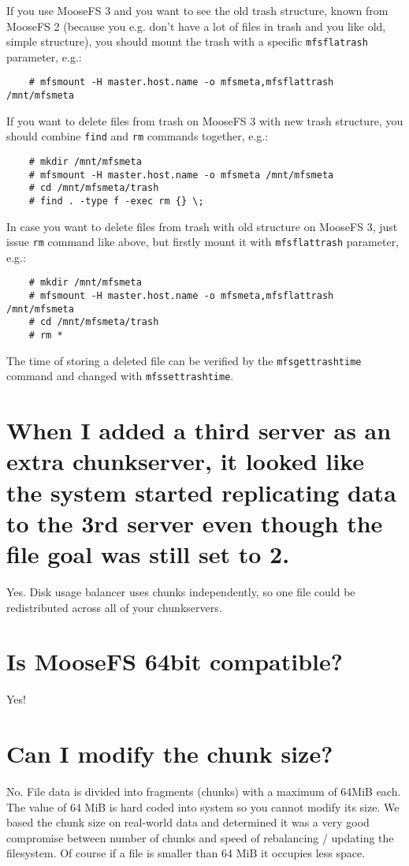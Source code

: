 \documentclass[a4paper,11pt,english]{report}
\def\code#1{\texttt{#1}}
\begin{document}
		If you use MooseFS 3 and you want to see the old trash structure, known from MooseFS 2 (because you e.g. don't have a lot of files in trash and you like old, simple structure), you should mount the trash with a specific \code{mfsflatrash} parameter, e.g.:
		\begin{lstlisting}
	# mfsmount -H master.host.name -o mfsmeta,mfsflattrash /mnt/mfsmeta
		\end{lstlisting}
				
		If you want to delete files from trash on MooseFS 3 with new trash structure, you should combine \code{find} and \code{rm} commands together, e.g.:
		
		\begin{lstlisting}
	# mkdir /mnt/mfsmeta
	# mfsmount -H master.host.name -o mfsmeta /mnt/mfsmeta
	# cd /mnt/mfsmeta/trash
	# find . -type f -exec rm {} \;
		\end{lstlisting}
		
		In case you want to delete files from trash with old structure on MooseFS 3, just issue \code{rm} command like above, but firstly mount it with \code{mfsflattrash} parameter, e.g.:
		
		\begin{lstlisting}
	# mkdir /mnt/mfsmeta
	# mfsmount -H master.host.name -o mfsmeta,mfsflattrash /mnt/mfsmeta
	# cd /mnt/mfsmeta/trash
	# rm *
		\end{lstlisting}
		
		The time of storing a deleted file can be verified by the \code{mfsgettrashtime} command and changed with \code{mfssettrashtime}.
		
		
		\section{When I added a third server as an extra chunkserver, it looked like the system started replicating data to the 3rd server even though the file goal was still set to 2.}
		Yes. Disk usage balancer uses chunks independently, so one file could be redistributed across all of your chunkservers.
		
		
		\section{Is MooseFS 64bit compatible?}
		Yes!
		
		
		\section{Can I modify the chunk size?}
		No. File data is divided into fragments (chunks) with a maximum of 64MiB each. The value of 64 MiB is hard coded into system so you cannot modify its size. We based the chunk size on real-world data and determined it was a very good compromise between number of chunks and speed of rebalancing / updating the filesystem. Of course if a file is smaller than 64 MiB it occupies less space. 
		
\end{document}
